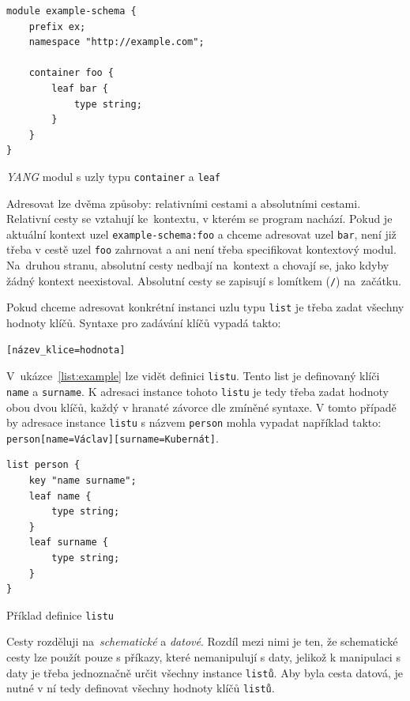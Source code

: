 \documentclass[thesis=B,czech,hidelinks]{FITthesis}[2019/03/06]
\begin{document}
\begin{listing}
\begin{verbatim}
module example-schema {
    prefix ex;
    namespace "http://example.com";

    container foo {
        leaf bar {
            type string;
        }
    }
}
\end{verbatim}
\caption{\textit{YANG} modul s uzly typu \texttt{container} a \texttt{leaf}}\label{yang:adresace}
\end{listing}

Adresovat lze dvěma způsoby: relativními cestami a absolutními cestami. Relativní cesty se vztahují ke~kontextu, v kterém se program nachází. Pokud je aktuální kontext uzel \texttt{example-schema:foo} a chceme adresovat uzel \texttt{bar}, není již třeba v cestě uzel \texttt{foo} zahrnovat a ani není třeba specifikovat kontextový modul. Na~druhou stranu, absolutní cesty nedbají na~kontext a chovají se, jako kdyby žádný kontext neexistoval. Absolutní cesty se zapisují s lomítkem (\texttt{/}) na~začátku.

Pokud chceme adresovat konkrétní instanci uzlu typu \texttt{list} je třeba zadat všechny hodnoty klíčů. Syntaxe pro zadávání klíčů vypadá takto:
\begin{verbatim}
[název_klice=hodnota]
\end{verbatim}
V~ukázce~\ref{list:example} lze vidět definici \texttt{listu}. Tento list je definovaný klíči \texttt{name} a \texttt{surname}. K adresaci instance tohoto \texttt{listu} je tedy třeba zadat hodnoty obou dvou klíčů, každý v hranaté závorce dle zmíněné syntaxe. V tomto případě by adresace instance \texttt{listu} s názvem \texttt{person} mohla vypadat například takto: \verb¨person[name=Václav][surname=Kubernát]¨.

\begin{listing}[H]
\begin{verbatim}
list person {
    key "name surname";
    leaf name {
        type string;
    }
    leaf surname {
        type string;
    }
}
\end{verbatim}
\caption{Příklad definice \texttt{listu}}\label{list:example}
\end{listing}

Cesty rozděluji na~\textit{schematické} a \textit{datové}. Rozdíl mezi nimi je ten, že schematické cesty lze použít pouze s příkazy, které nemanipulují s daty, jelikož k manipulaci s daty je třeba jednoznačně určit všechny instance \texttt{listů}. Aby byla cesta datová, je nutné v ní tedy definovat všechny hodnoty klíčů \texttt{listů}.
\end{document}
